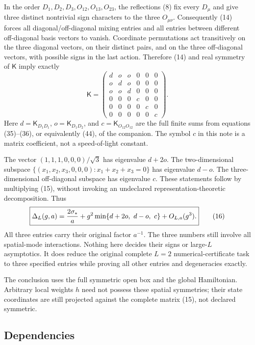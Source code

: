 \documentclass[
  11pt,
]{article}
\begin{document}
In the order \(D_1,D_2,D_3,O_{12},O_{13},O_{23}\), the reflections (8)
fix every \(D_\mu\) and give three distinct nontrivial sign characters
to the three \(O_{\mu\nu}\). Consequently (14) forces all
diagonal/off-diagonal mixing entries and all entries between different
off-diagonal basis vectors to vanish. Coordinate permutations act
transitively on the three diagonal vectors, on their distinct pairs, and
on the three off-diagonal vectors, with possible signs in the last
action. Therefore (14) and real symmetry of \(\mathsf K\) imply exactly
\[
 \boxed{\mathsf K=
 \begin{pmatrix}
 d&o&o&0&0&0\\
 o&d&o&0&0&0\\
 o&o&d&0&0&0\\
 0&0&0&c&0&0\\
 0&0&0&0&c&0\\
 0&0&0&0&0&c
 \end{pmatrix}.}
 \tag{15}
\] Here \(d=\mathsf K_{D_1D_1}\), \(o=\mathsf K_{D_1D_2}\), and
\(c=\mathsf K_{O_{12}O_{12}}\) are the full finite sums from equations
(35)--(36), or equivalently (44), of the companion. The symbol \(c\) in
this note is a matrix coefficient, not a speed-of-light constant.

The vector \((1,1,1,0,0,0)/\sqrt3\) has eigenvalue \(d+2o\). The
two-dimensional subspace \(\{(x_1,x_2,x_3,0,0,0):x_1+x_2+x_3=0\}\) has
eigenvalue \(d-o\). The three-dimensional off-diagonal subspace has
eigenvalue \(c\). These statements follow by multiplying (15), without
invoking an undeclared representation-theoretic decomposition. Thus \[
 \boxed{\Delta_L(g,a)={2\sigma_*\over a}
             +g^2\min\{d+2o,\ d-o,\ c\}+O_{L,a}(g^3).}
 \tag{16}
\] All three entries carry their original factor \(a^{-1}\). The three
numbers still involve all spatial-mode interactions. Nothing here
decides their signs or large-\(L\) asymptotics. It does reduce the
original complete \(L=2\) numerical-certificate task to three specified
entries while proving all other entries and degeneracies exactly.

The conclusion uses the full symmetric open box and the global
Hamiltonian. Arbitrary local weights \(h\) need not possess these
spatial symmetries; their state coordinates are still projected against
the complete matrix (15), not declared symmetric.

\subsection{Dependencies}\label{weak-coupling-part-16-dependencies}
\end{document}
